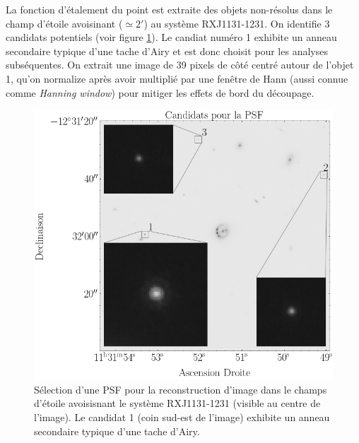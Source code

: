 \documentclass[times,10pt,twocolumn]{article}
\begin{document}
La fonction d'étalement du point est extraite des objets non-résolus dans le
champ d'étoile 
avoisinant ($\simeq 2'$) au système RXJ1131-1231. 
On identifie 3 candidats potentiels (voir figure \ref{fig:psf}). 
Le candiat numéro 1 exhibite un anneau secondaire 
typique d'une tache d'Airy et est donc choisit pour les analyses subséquentes. 
On extrait une image de 39 pixels de côté centré autour de l'objet 1, qu'on normalize 
après avoir 
multiplié par une fenêtre de Hann (aussi connue comme \textit{Hanning window})
pour mitiger les effets de bord du découpage.

\begin{figure}[H]
        \centering
        \includegraphics[width=\linewidth]{psf_cutout}
        \caption{ Sélection d'une PSF pour la reconstruction d'image dans le champs 
                d'étoile avoisisnant le système RXJ1131-1231 (visible au centre 
                de l'image). Le candidat 1 (coin sud-est de l'image) exhibite 
                un anneau secondaire typique d'une tache d'Airy.
        }
        \label{fig:psf}
\end{figure}
\end{document}

